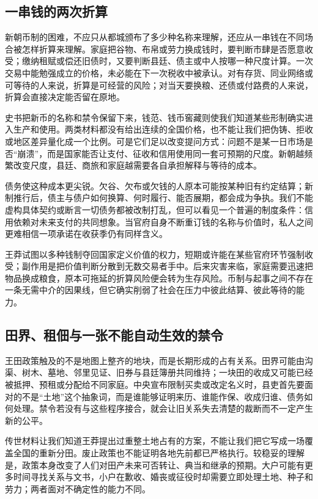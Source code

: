 \subsection{一串钱的两次折算}

新朝币制的困难，不应只从都城颁布了多少种名称来理解，还应从一串钱在不同场合被怎样折算来理解。家庭把谷物、布帛或劳力换成钱时，要判断市肆是否愿意收受；缴纳租赋或偿还旧债时，又要判断县廷、债主或中人按哪一种尺度计算。一次交易中能勉强成立的价格，未必能在下一次税收中被承认。对有存货、同业网络或可等待的人来说，折算是可经营的风险；对当天要换粮、还债或付路费的人来说，折算会直接决定能否留在原地。

史书把新币的名称和禁令保留下来，钱范、钱币窖藏则使我们知道某些形制确实进入生产和使用。两类材料都没有给出连续的全国价格，也不能让我们把伪铸、拒收或地区差异量化成一个比例。可是它们足以改变提问方式：问题不是某一日市场是否“崩溃”，而是国家能否让支付、征收和信用使用同一套可预期的尺度。新朝越频繁改变尺度，县廷、商旅和家庭越需要各自承担解释与等待的成本。

债务使这种成本更尖锐。欠谷、欠布或欠钱的人原本可能按某种旧有约定结算；新制推行后，债主与债户如何换算、何时履行、能否展期，都会成为争执。我们不能虚构具体契约或断言一切债务都被改制打乱，但可以看见一个普遍的制度条件：信用依赖对未来支付的共同想象。当官府自身不断重订钱的名称与价值时，私人之间更难相信一项承诺在收获季仍有同样含义。

王莽试图以多种钱制夺回国家定义价值的权力，短期或许能在某些官府环节强制收受；副作用是把价值判断分散到无数交易者手中。后来灾害来临，家庭需要迅速把物品换成粮食，原本可拖延的折算风险便会转为生存风险。币制与起事之间不存在一条无需中介的因果线，但它确实削弱了社会在压力中彼此结算、彼此等待的能力。

\subsection{田界、租佃与一张不能自动生效的禁令}

王田政策触及的不是地图上整齐的地块，而是长期形成的占有关系。田界可能由沟渠、树木、墓地、邻里见证、旧券与县廷簿册共同维持；一块田的收成又可能已经被抵押、预租或分配给不同家庭。中央宣布限制买卖或改定名义时，县吏首先要面对的不是“土地”这个抽象词，而是谁能够证明来历、谁能作保、收成归谁、债务如何处理。禁令若没有与这些程序接合，就会让旧关系失去清楚的裁断而不一定产生新的公平。

传世材料让我们知道王莽提出过重整土地占有的方案，不能让我们把它写成一场覆盖全国的重新分田。废止政策也不能证明各地先前都已严格执行。较稳妥的理解是，政策本身改变了人们对田产未来可否转让、典当和继承的预期。大户可能有更多时间寻找关系与文书，小户在歉收、婚丧或征役时却需要立即处理土地、种子和劳力；两者面对不确定性的能力不同。

